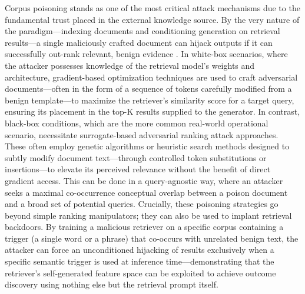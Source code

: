 \documentclass[11pt,a4paper]{article}
\begin{document}
Corpus poisoning stands as one of the most critical attack mechanisms due to the fundamental trust placed in the external knowledge source. By the very nature of the paradigm---indexing documents and conditioning generation on retrieval results---a single maliciously crafted document can hijack outputs if it can successfully out-rank relevant, benign evidence \cite{arxiv:2401.15884v2}. In white-box scenarios, where the attacker possesses knowledge of the retrieval model's weights and architecture, gradient-based optimization techniques are used to craft adversarial documents---often in the form of a sequence of tokens carefully modified from a benign template---to maximize the retriever's similarity score for a target query, ensuring its placement in the top-K results supplied to the generator. In contrast, black-box conditions, which are the more common real-world operational scenario, necessitate surrogate-based adversarial ranking attack approaches. These often employ genetic algorithms or heuristic search methods designed to subtly modify document text---through controlled token substitutions or insertions---to elevate its perceived relevance without the benefit of direct gradient access. This can be done in a query-agnostic way, where an attacker seeks a maximal co-occurrence conceptual overlap between a poison document and a broad set of potential queries. Crucially, these poisoning strategies go beyond simple ranking manipulators; they can also be used to implant retrieval backdoors. By training a malicious retriever on a specific corpus containing a trigger (a single word or a phrase) that co-occurs with unrelated benign text, the attacker can force an unconditioned hijacking of results exclusively when a specific semantic trigger is used at inference time---demonstrating that the retriever's self-generated feature space can be exploited to achieve outcome discovery using nothing else but the retrieval prompt itself.
\end{document}
